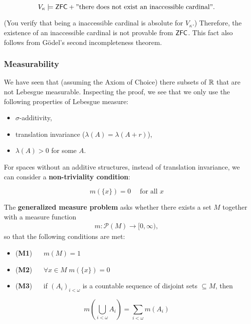 \begin{equation}
V_\kappa \models \mathsf{ZFC} + \text{''there does not exist an inaccessible cardinal''}.
\end{equation}

(You verify that being a inaccessible cardinal is absolute for $V_\kappa$.) Therefore, the existence of an inaccessible cardinal is not provable from $\mathsf{ZFC}$. This fact also follows from Gödel's second incompleteness theorem.

\subsubsection{Measurability}

We have seen that (assuming the Axiom of Choice) there subsets of $\mathbb{R}$ that are not Lebesgue measurable. Inspecting the proof, we see that we only use the following properties of Lebesgue measure:

\begin{itemize}
\item $\sigma$-additivity,
\item translation invariance ($\lambda(A) = \lambda(A+r)$),
\item $\lambda(A) > 0$ for some $A$.
\end{itemize}

For spaces without an additive structures, instead of translation invariance, we can consider a \textbf{non-triviality condition}:

\begin{equation}
m(\{x\})=0 \quad \text{ for all $x$}
\end{equation}

The \textbf{generalized measure problem} asks whether there exists a set $M$ together with a measure function
\begin{gather*}
m: \mathcal{P}(M) \to [0,\infty),
\end{gather*}
so that the following conditions are met:

\begin{itemize}
\item (\textbf{M1}) $\quad$ $m(M) =1$
\item (\textbf{M2}) $\quad$ $\forall x \in M \; m(\{x\})=0$
\item (\textbf{M3}) $\quad$ if $(A_i)_{i < \omega}$ is a countable sequence of disjoint sets $\subseteq M$, then
\end{itemize}
\begin{equation*}
m\left(\bigcup_{i<\omega} A_i\right ) =  \sum_{i<\omega} m(A_i)
\end{equation*}

